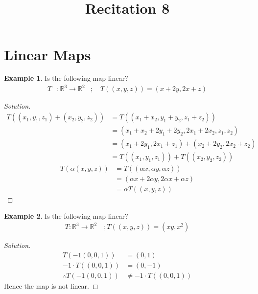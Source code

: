 \documentclass[fleqn, a4paper, 12pt]{article}
\title{Recitation 8}
\author{}
\date{\formatdate{17}{12}{2014}}
\theoremstyle{definition}
\newtheorem{example}{Example}
\theoremstyle{theorem}
\newenvironment{solution}
{\begin{proof}[Solution]\let\qed\relax}
	{\end{proof}}
\begin{document}
\maketitle

\tableofcontents

\newpage
\section{Linear Maps}

\begin{example}
	Is the following map linear?
	\begin{align*}
		T &: \mathbb{R}^3 \to \mathbb{R}^2 &;\quad T((x, y, z)) = (x+2y, 2x+z)
	\end{align*}
\end{example}

\begin{solution}
	\begin{align*}
		T((x_1, y_1, z_1) + (x_2, y_2, z_2)) &= T((x_1 + x_2, y_1 + y_2, z_1 + z_2))\\
		&= (x_1 + x_2 + 2y_1 + 2y_2, 2x_1 + 2x_2, z_1, z_2)\\
		&= (x_1 + 2y_1, 2x_1 + z_1) + (x_2 + 2y_2, 2x_2 + z_2)\\
		&= T((x_1, y_1, z_1)) + T((x_2, y_2, z_2))
	\end{align*}
	\begin{align*}
		T(\alpha (x, y, z)) &= T((\alpha x, \alpha y, \alpha z))\\
		&= (\alpha x + 2 \alpha y, 2 \alpha x + \alpha z)\\
		&= \alpha T((x, y, z))
	\end{align*}
\end{solution}

\begin{example}
	Is the following map linear?
	\begin{align*}
		T : \mathbb{R}^3 \to \mathbb{R}^2 \quad; T((x, y, z)) = (xy, x^2)
	\end{align*}
\end{example}

\begin{solution}
	\begin{align*}
		T(-1(0, 0, 1)) &= (0,1)\\
		-1 \cdot T((0, 0, 1)) &= (0, -1)\\
		\therefore T(-1(0, 0, 1)) &\neq -1 \cdot T((0, 0, 1))
	\end{align*}
	Hence the map is not linear.
\end{solution}
\end{document}
